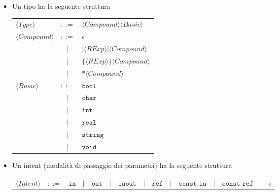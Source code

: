 \documentclass{report}
\newcommand{\nonterm}[1]{\langle #1 \rangle}
\newcommand{\term}[1]{\texttt{#1}}
\begin{document}
\begin{itemize}
    \item Un tipo ha la seguente struttura
        \begin{center}
        \begin{tabular}{l c l}
        $\nonterm{Type}$        &   $::=$   &   $\nonterm{Compound} \nonterm{Basic}$                    \\
        $\nonterm{Compound}$    &   $::=$   &   $\epsilon$                                              \\
                                &    $|$    &   $\term{[} \nonterm{RExp} \term{]} \nonterm{Compound}$   \\
                                &    $|$    &   $\term{\{} \nonterm{RExp} \term{\}} \nonterm{Compound}$ \\
                                &    $|$    &   $\term{*} \nonterm{Compound}$                           \\
        $\nonterm{Basic}$       &   $::=$   &   $\term{bool}$                                           \\
                                &    $|$    &   $\term{char}$                                           \\
                                &    $|$    &   $\term{int}$                                            \\
                                &    $|$    &   $\term{real}$                                           \\
                                &    $|$    &   $\term{string}$                                         \\
                                &    $|$    &   $\term{void}$

        \end{tabular}
        \end{center}

    \item Un intent (modalità di passaggio dei parametri) ha la seguente struttura
        \begin{center}
        \begin{tabular}{*{15}c}
        $\nonterm{Intent}$      &   $::=$   &   $\term{in}$                                           
                                &    $|$    &   $\term{out}$                                          
                                &    $|$    &   $\term{inout}$                                        
                                &    $|$    &   $\term{ref}$                                          
                                &    $|$    &   $\term{const in}$                                     
                                &    $|$    &   $\term{const ref}$
                                &    $|$    &   $\epsilon$


\end{tabular}
\end{center}
\end{itemize}
\end{document}
